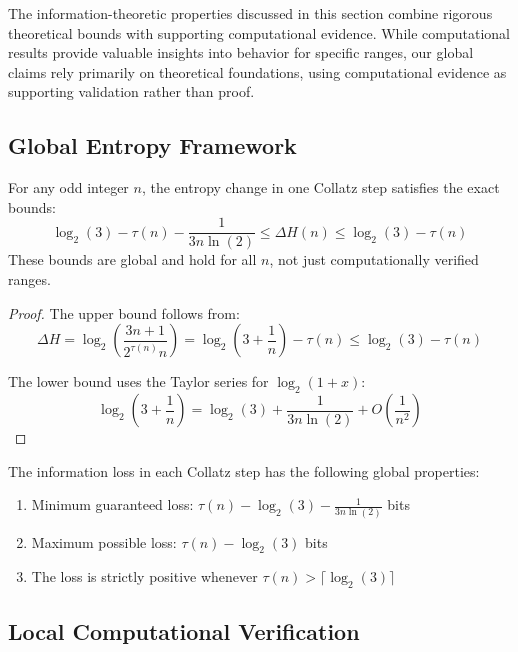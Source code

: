 \begin{remark}
The information-theoretic properties discussed in this section combine rigorous theoretical bounds with supporting computational evidence. While computational results provide valuable insights into behavior for specific ranges, our global claims rely primarily on theoretical foundations, using computational evidence as supporting validation rather than proof.
\end{remark}

\subsection{Global Entropy Framework}

\begin{theorem}
For any odd integer $n$, the entropy change in one Collatz step satisfies the exact bounds:
\[
\log_2(3) - \tau(n) - \frac{1}{3n\ln(2)} \leq \Delta H(n) \leq \log_2(3) - \tau(n)
\]
These bounds are global and hold for all $n$, not just computationally verified ranges.
\end{theorem}

\begin{proof}
The upper bound follows from:
\[
\Delta H = \log_2\left(\frac{3n + 1}{2^{\tau(n)}n}\right) = \log_2(3 + \frac{1}{n}) - \tau(n) \leq \log_2(3) - \tau(n)
\]

The lower bound uses the Taylor series for $\log_2(1+x)$:
\[
\log_2(3 + \frac{1}{n}) = \log_2(3) + \frac{1}{3n\ln(2)} + O(\frac{1}{n^2})
\]
\end{proof}

\begin{theorem}
The information loss in each Collatz step has the following global properties:
\begin{enumerate}
\item Minimum guaranteed loss: $\tau(n) - \log_2(3) - \frac{1}{3n\ln(2)}$ bits
\item Maximum possible loss: $\tau(n) - \log_2(3)$ bits
\item The loss is strictly positive whenever $\tau(n) > \lceil\log_2(3)\rceil$
\end{enumerate}
\end{theorem}

\subsection{Local Computational Verification}

